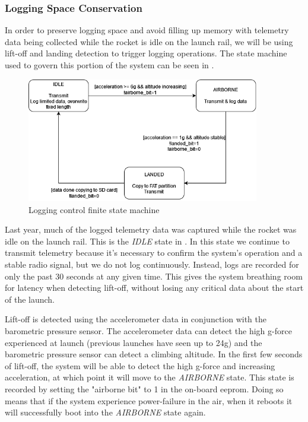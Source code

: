 \subsubsection{Logging Space Conservation}

In order to preserve logging space and avoid filling up memory with telemetry data being collected while the rocket is idle on the launch rail, we will be using lift-off and landing detection to trigger logging operations. The state machine used to govern this portion of the system can be seen in .

\begin{figure}[H]
    \centering
    \includegraphics[width=4in]{./assets/diagrams/Flight State FSM.png}
    \caption{Logging control finite state machine}
    \label{fig:logging-fsm}
\end{figure}

Last year, much of the logged telemetry data was captured while the rocket was idle on the launch rail. This is the \textit{IDLE} state in . In this state we continue to transmit telemetry because it's necessary to confirm the system's operation and a stable radio signal, but we do not log continuously. Instead, logs are recorded for only the past 30 seconds at any given time. This gives the system breathing room for latency when detecting lift-off, without losing any critical data about the start of the launch.

Lift-off is detected using the accelerometer data in conjunction with the barometric pressure sensor. The accelerometer data can detect the high g-force experienced at launch (previous launches have seen up to 24g) and the barometric pressure sensor can detect a climbing altitude. In the first few seconds of lift-off, the system will be able to detect the high g-force and increasing acceleration, at which point it will move to the \textit{AIRBORNE} state. This state is recorded by setting the "airborne bit" to 1 in the on-board \gls{eeprom}. Doing so means that if the system experience power-failure in the air, when it reboots it will successfully boot into the \textit{AIRBORNE} state again.

